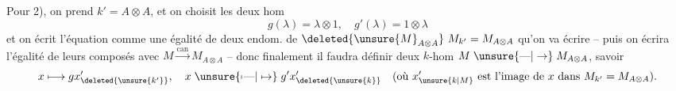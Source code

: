 Pour  2), on  prend $k'=A\otimes A$, et on choisit les deux hom
\[
 g(\lambda)=\lambda\otimes1,\quad g'(\lambda)=1\otimes\lambda
\]
et on écrit l'équation comme une égalité de deux endom. de $\deleted{\unsure{M}_{A\otimes A}}\ M_{k'}=M_{A\otimes A}$ qu'on va écrire -- puis on écrira l'égalité de leurs composés avec $M\overset{\mathrm{can}}{\longrightarrow}M_{A\otimes A}$ -- donc finalement il faudra définir deux $k$-hom $M\mathrel{\unsure{\text{---}|\to}}M_{A\otimes A}$, savoir
\[
 x\longmapsto gx'_{\deleted{\unsure{k'}}},\quad x\mathrel{\unsure{\mapstochar\text{---}|\mapsto}}g'x'_{\deleted{\unsure{k}}}
 \quad\text{(où }x'_{\unsure{k|M}}\text{ est l'image de }x\text{ dans }M_{k'}=M_{A\otimes A}\text{).}
\]

